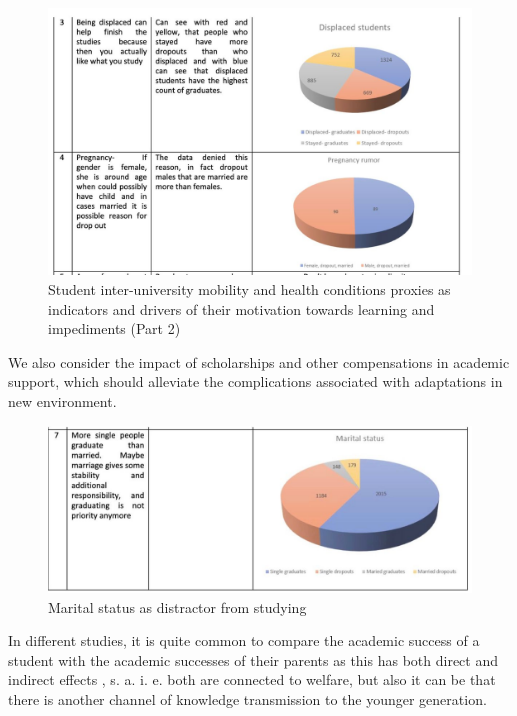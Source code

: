 \documentclass[
  letterpaper,
  DIV=11,
  numbers=noendperiod]{scrartcl}
\begin{document}
\begin{figure}

{\centering \includegraphics{./figs/reasons2.jpg}

}

\caption{\label{fig-word-2}Student inter-university mobility and health
conditions proxies as indicators and drivers of their motivation towards
learning and impediments (Part 2)}

\end{figure}

We also consider the impact of scholarships and other compensations in
academic support, which should alleviate the complications associated
with adaptations in new environment.

\begin{figure}

{\centering \includegraphics{./figs/reasonsIII.jpg}

}

\caption{\label{fig-word-3}Marital status as distractor from studying}

\end{figure}

In different studies, it is quite common to compare the academic success
of a student with the academic successes of their parents as this has
both direct and indirect effects , s. a. i. e. both are connected to
welfare, but also it can be that there is another channel of knowledge
transmission to the younger generation.
\end{document}
